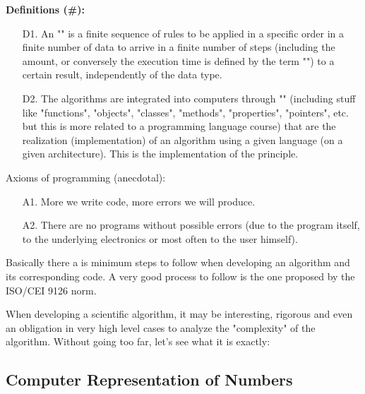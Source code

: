 	\textbf{Definitions (\#\mydef):}
	\begin{enumerate}
		\item[D1.]  An "\label{algorithm}" is a finite sequence of rules to be applied in a specific order in a finite number of data to arrive in a finite number of steps (including the amount, or conversely the execution time is defined by the term "") to a certain result, independently of the data type.
		
		\item[D2.] The algorithms are integrated into computers through "" (including stuff like "functions", "objects", "classes", "methods", "properties", "pointers", etc. but this is more related to a programming language course) that are the realization (implementation) of an algorithm using a given language (on a given architecture). This is the implementation of the principle.
	\end{enumerate}
	
	Axioms of programming (anecdotal):

	\begin{enumerate}
		\item[A1.] More we write code, more errors we will produce.
		
		\item[A2.] There are no programs without possible errors (due to the program itself, to the underlying electronics or most often to the user himself).
	\end{enumerate}
	
	\begin{tcolorbox}[title=Remark,colframe=black,arc=10pt]
Basically there a is minimum steps to follow when developing an algorithm and its corresponding code. A very good process to follow is the one proposed by the ISO/CEI 9126 norm.
	\end{tcolorbox}	

	When developing a scientific algorithm, it may be interesting, rigorous and even an obligation in very high level cases to analyze the "complexity" of the algorithm. Without going too far, let's see what it is exactly:
	
	\subsection{Computer Representation of Numbers}\label{computer representation of numbers}
	
